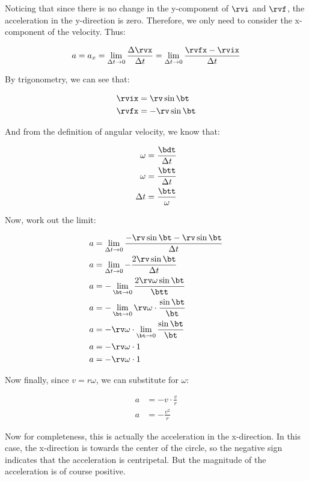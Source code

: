 Noticing that since there is no change in the y-component of \(\rvi\) and \(\rvf\), the acceleration in the y-direction is zero. Therefore, we only need to consider the x-component of the velocity. Thus:

\begin{equation*}
  a = a_x = \lim_{\Delta t \to 0} \frac{\Delta \rvx}{\Delta t} = \lim_{\Delta t \to 0} \frac{\rvfx - \rvix}{\Delta t}
\end{equation*}

By trigonometry, we can see that:

\begin{align*}
  \rvix &= \rv \sin\bt \\
  \rvfx &= -\rv \sin\bt
\end{align*}

And from the definition of angular velocity, we know that:

\begin{align*}
  \omega &= \frac{\bdt}{\Delta t} \\
  \omega &= \frac{\btt}{\Delta t} \\
  \Delta t &= \frac{\btt}{\omega}
\end{align*}

Now, work out the limit:

\begin{align*}
  a &= \lim_{\Delta t \to 0} \frac{-\rv \sin\bt - \rv \sin\bt}{\Delta t} \\
  a &= \lim_{\Delta t \to 0} -\frac{2\rv \sin\bt}{\Delta t} \\
  a &= -\lim_{\bt \to 0} \frac{2\rv\omega \sin\bt}{\btt} \\
  a &= -\lim_{\bt \to 0} \rv\omega \cdot \frac{\sin\bt}\bt \\
  a &= -\rv\omega \cdot \lim_{\bt \to 0} \frac{\sin\bt}\bt \\
  a &= -\rv\omega \cdot 1 \\
  a &= -\rv\omega \cdot 1
\end{align*}

Now finally, since \(v = r\omega\), we can substitute for \(\omega\):

\begin{align*}
  a &= -v \cdot \frac{v}{r} \\
  a &= -\frac{v^2}{r}
\end{align*}

Now for completeness, this is actually the acceleration in the x-direction. In this case, the x-direction is towards the center of the circle, so the negative sign indicates that the acceleration is centripetal. But the magnitude of the acceleration is of course positive.

\let\rv\undefined
\let\rvf\undefined
\let\rvfx\undefined
\let\rvi\undefined
\let\rvix\undefined
\let\rvx\undefined
\let\bt\undefined
\let\bdt\undefined
\let\btt\undefined
